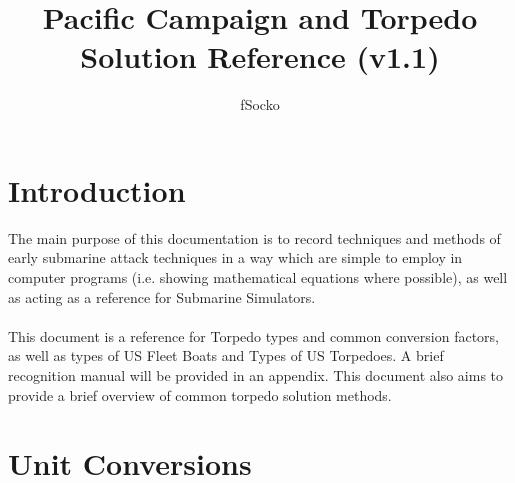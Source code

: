 \documentclass{article}
\author{fSocko}
\title{Pacific Campaign and Torpedo Solution Reference (v1.1)}
\begin{document}
\maketitle
\pagebreak
\tableofcontents
\pagebreak

\section{Introduction}
The main purpose of this documentation is to record techniques and methods of early submarine attack techniques in a way which are simple to employ in computer programs (i.e. showing mathematical equations where possible), as well as acting as a reference for Submarine Simulators.
\\ \\
This document is a reference for Torpedo types and common conversion factors, as well as types of US Fleet Boats and Types of US Torpedoes. A brief recognition manual will be provided in an appendix. This document also aims to provide a brief overview of common torpedo solution methods.

\section{Unit Conversions}

\end{document}
